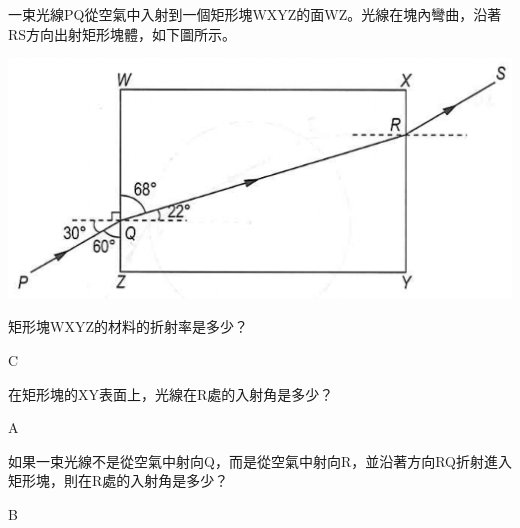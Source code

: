 {
    一束光線PQ從空氣中入射到一個矩形塊WXYZ的面WZ。光線在塊內彎曲，沿著RS方向出射矩形塊體，如下圖所示。
    \par{\par\centering\includegraphics[width=.4\textwidth]{./img/ch2_refraction_mc_2024-05-18-16-38-40.png}\par}
}{}

{
    矩形塊WXYZ的材料的折射率是多少？
    \begin{tasks}
    \end{tasks}

}{C}

{
    在矩形塊的XY表面上，光線在R處的入射角是多少？
    \begin{tasks}
        \task {}
        \task {}
        \task {}
        \task {}
    \end{tasks}

}{A}

{
    如果一束光線不是從空氣中射向Q，而是從空氣中射向R，並沿著方向RQ折射進入矩形塊，則在R處的入射角是多少？
    \begin{tasks}
        \task {}
        \task {}
        \task {}
        \task {}
    \end{tasks}
}{B}

